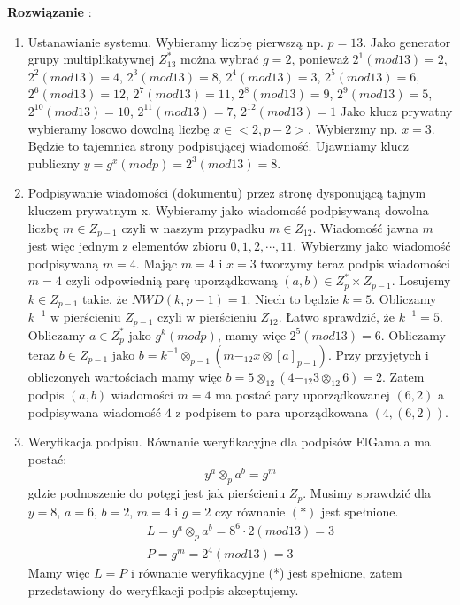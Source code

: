 \documentclass[a4paper,10pt, twocolumn]{article}
\begin{document}
\textbf{Rozwiązanie} : 
\begin{enumerate}
	\item Ustanawianie systemu. Wybieramy liczbę pierwszą np. $p=13$. Jako generator grupy multiplikatywnej $Z^*_{13}$ można wybrać $g=2$, ponieważ $2^1(mod13)=2$, $2^2(mod13)=4$,  $2^3(mod13)=8$, $2^4(mod13)=3$, $2^5(mod13)=6$, $2^6(mod13)=12$, $2^7(mod13)=11$, $2^8(mod13)=9$, $2^9(mod13)=5$, $2^{10}(mod13)=10$, $2^{11}(mod13)=7$, $2^{12}(mod13)=1$
	Jako klucz prywatny wybieramy losowo dowolną liczbę $x \in <2,p-2>$. Wybierzmy np. $x=3$. Będzie to tajemnica strony podpisującej wiadomość. Ujawniamy klucz publiczny $y=g^x(modp)=2^3(mod13)=8$.
	\item Podpisywanie wiadomości (dokumentu) przez stronę dysponującą tajnym kluczem prywatnym x.
	Wybieramy jako wiadomość podpisywaną dowolna liczbę $m \in Z_{p-1}$ czyli w naszym przypadku $m \in Z_{12}$. Wiadomość jawna $m$ jest więc jednym z elementów zbioru ${0,1,2,\cdots,11}$. Wybierzmy jako wiadomość podpisywaną $m=4$. Mając $m=4$ i $x=3$ tworzymy teraz podpis wiadomości $m=4$ czyli odpowiednią parę uporządkowaną $(a, b) \in Z^*_p \times Z_{p-1}$.
	Losujemy $k \in Z_{p-1}$ takie, że $NWD(k,p-1)=1$. Niech to będzie $k=5$. Obliczamy $k^{-1}$ w pierścieniu $Z_{p-1}$ czyli w pierścieniu $Z_{12}$. Łatwo sprawdzić, że  $k^{-1}=5$. Obliczamy $a \in Z^*_p$ jako $g^k(modp)$, mamy więc $2^5(mod13)=6$.
	Obliczamy teraz $b \in Z_{p-1}$ jako $b=k^{-1}\otimes_{p-1}(m-_{12}x\otimes[a]_{p-1})$. Przy przyjętych i obliczonych wartościach mamy więc $b=5\otimes_{12}(4-_{12}3\otimes_{12}6)=2$. Zatem podpis $(a,b)$ wiadomości $m=4$ ma postać pary uporządkowanej $(6,2)$ a podpisywana wiadomość $4$ z podpisem to para uporządkowana $(4,(6,2))$.
	\item Weryfikacja podpisu. Równanie weryfikacyjne dla podpisów ElGamala ma postać: 
	\begin{equation*}
		y^a\otimes_p a^b=g^m
	\end{equation*}
	gdzie podnoszenie do potęgi jest jak pierścieniu $Z_p$. Musimy sprawdzić dla $y=8$, $a=6$, $b=2$, $m=4$ i $g=2$ czy równanie $(*)$ jest spełnione.
	\begin{equation*}
		\begin{array}{c}L=y^a\otimes_p a^b=8^6\cdot2(mod13)=3 \\ P=g^m=2^4(mod13)=3\end{array}
	\end{equation*}
	Mamy więc $L=P$ i równanie weryfikacyjne (*) jest spełnione, zatem przedstawiony do weryfikacji podpis akceptujemy.
\end{enumerate}
\end{document}
